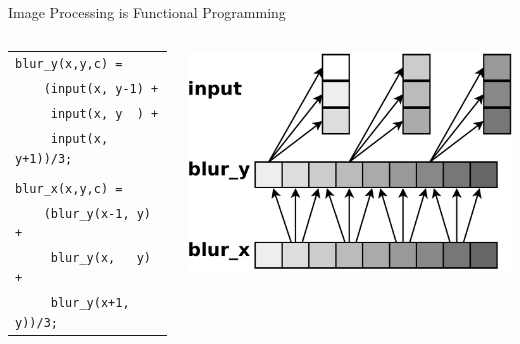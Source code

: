 \documentclass[xcolor=dvipsnames]{beamer}
\begin{document}
\begin{frame}{Image Processing is Functional Programming}
	\begin{columns}

	\begin{tabular}{l}
		\texttt{blur\_y(x,y,c) =} \\
		\texttt{~~~~(input(x, y-1) +}\\
		\texttt{~~~~~input(x, y~~) +}\\
		\texttt{~~~~~input(x, y+1))/3;}\\
		\\
		\texttt{blur\_x(x,y,c) =} \\
		\texttt{~~~~(blur\_y(x-1, y) +}\\
		\texttt{~~~~~blur\_y(x,~~~y) +}\\
		\texttt{~~~~~blur\_y(x+1, y))/3;}\\
	\end{tabular}

	\includegraphics[width=\textwidth]{blurx.pdf}
	\end{columns}
\end{frame}
\end{document}
